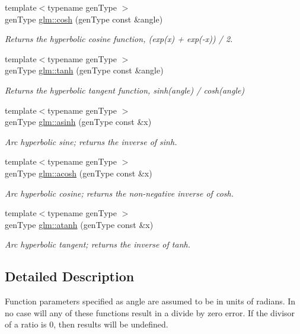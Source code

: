 \begin{DoxyCompactItemize}
{\footnotesize template$<$typename gen\-Type $>$ }\\gen\-Type \hyperlink{group__core__func__trigonometric_gaf1b20113fe439fa48524e8c35ea2c1d0}{glm\-::cosh} (gen\-Type const \&angle)
\begin{DoxyCompactList}\small\item\em Returns the hyperbolic cosine function, (exp(x) + exp(-\/x)) / 2. \end{DoxyCompactList}\item 
{\footnotesize template$<$typename gen\-Type $>$ }\\gen\-Type \hyperlink{group__core__func__trigonometric_ga5315f571fd52f30d368abc056c4aea13}{glm\-::tanh} (gen\-Type const \&angle)
\begin{DoxyCompactList}\small\item\em Returns the hyperbolic tangent function, sinh(angle) / cosh(angle) \end{DoxyCompactList}\item 
{\footnotesize template$<$typename gen\-Type $>$ }\\gen\-Type \hyperlink{group__core__func__trigonometric_ga615d386dcfb41cdbbca2609c53113aac}{glm\-::asinh} (gen\-Type const \&x)
\begin{DoxyCompactList}\small\item\em Arc hyperbolic sine; returns the inverse of sinh. \end{DoxyCompactList}\item 
{\footnotesize template$<$typename gen\-Type $>$ }\\gen\-Type \hyperlink{group__core__func__trigonometric_ga0f37ff6b6878a0169cd41249e5377e09}{glm\-::acosh} (gen\-Type const \&x)
\begin{DoxyCompactList}\small\item\em Arc hyperbolic cosine; returns the non-\/negative inverse of cosh. \end{DoxyCompactList}\item 
{\footnotesize template$<$typename gen\-Type $>$ }\\gen\-Type \hyperlink{group__core__func__trigonometric_gadeda850d5dff43d4d069854b1b6a623c}{glm\-::atanh} (gen\-Type const \&x)
\begin{DoxyCompactList}\small\item\em Arc hyperbolic tangent; returns the inverse of tanh. \end{DoxyCompactList}\end{DoxyCompactItemize}


\subsection{Detailed Description}
Function parameters specified as angle are assumed to be in units of radians. In no case will any of these functions result in a divide by zero error. If the divisor of a ratio is 0, then results will be undefined.


